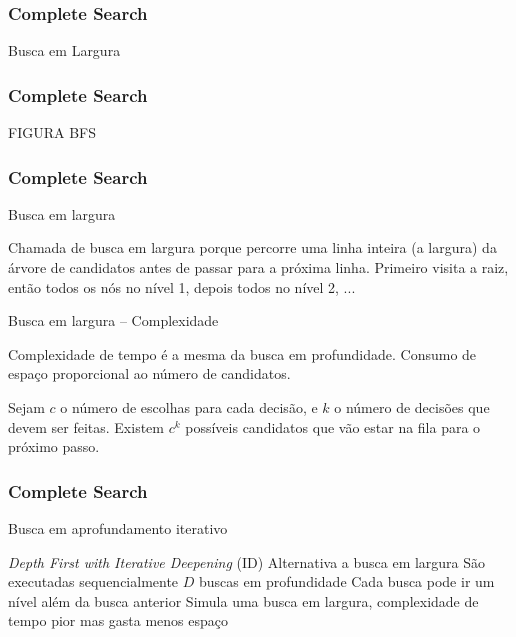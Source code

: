 \begin{frame}
\frametitle{Complete Search}
\begin{block}{Busca em Largura}
\end{block}
\end{frame}

\begin{frame}
\frametitle{Complete Search}
\huge FIGURA BFS
\end{frame}

\begin{frame}
\frametitle{Complete Search}
\begin{block}{Busca em largura}
\begin{itemize}
	\bitem Chamada de busca em largura porque percorre uma linha inteira (a largura) da árvore de candidatos antes de passar para a próxima linha.
	\bitem Primeiro visita a raiz, então todos os nós no nível 1, depois todos no nível 2, ...
\end{itemize}
\end{block}
\pause
\begin{block}{Busca em largura -- Complexidade}
\begin{itemize}
	\bitem Complexidade de tempo é a mesma da busca em profundidade.
	\bitem Consumo de espaço proporcional ao número de candidatos.
	\begin{itemize}
		\bitem Sejam $c$ o número de escolhas para cada decisão, e $k$ o número de decisões que devem ser feitas.
		\bitem Existem $c^k$ possíveis candidatos que vão estar na fila para o próximo passo.
	\end{itemize}
\end{itemize}
\end{block}
\end{frame}

\begin{frame}
\frametitle{Complete Search}
\begin{block}{Busca em aprofundamento iterativo}
\begin{itemize}	\bitem \emph{Depth First with Iterative Deepening} (ID)
	\bitem Alternativa a busca em largura
	\bitem São executadas sequencialmente $D$ buscas em profundidade
	\bitem Cada busca pode ir um nível além da busca anterior
	\bitem Simula uma busca em largura, complexidade de tempo pior mas gasta menos espaço
\end{itemize}
\end{block}
\end{frame}

